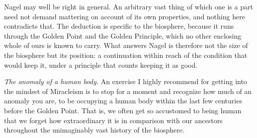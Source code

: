 Nagel may well be right in general. An arbitrary vast thing of which one is a
part need not demand mattering on account of its own properties, and nothing
here contradicts that. The deduction is specific to the biosphere, because it
runs through the Golden Point and the Golden Principle, which no other
enclosing whole of ours is known to carry. What answers Nagel is therefore not
the size of the biosphere but its position: a continuation within reach of the
condition that would keep it, under a principle that counts keeping it as
good.

\emph{The anomaly of a human body.} An exercise I highly recommend for getting
into the mindset of Miracleism is to stop for a moment and recognize how much
of an anomaly you are, to be occupying a human body within the last few
centuries before the Golden Point. That is, we often get so accustomed to
being human that we forget how extraordinary it is in comparison with our
ancestors throughout the unimaginably vast history of the biosphere.

